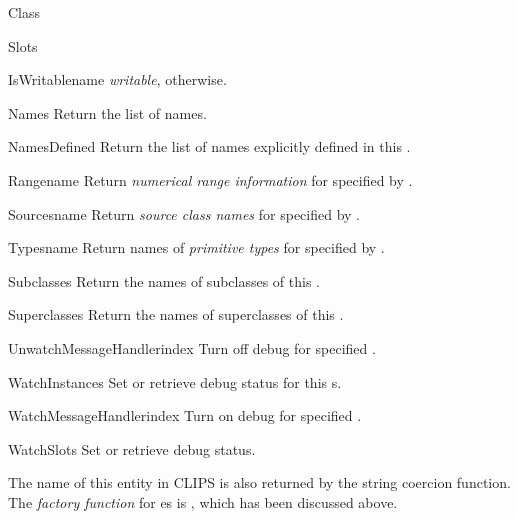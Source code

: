 \begin{classdesc*}{Class}
\begin{memberdesc}[property]{Slots}
\begin{methoddesc}{IsWritable}{name}
\emph{writable},  otherwise.
\end{methoddesc}
\begin{methoddesc}{Names}{}
Return the list of  names.
\end{methoddesc}
\begin{methoddesc}{NamesDefined}{}
Return the list of  names explicitly defined in this
.
\end{methoddesc}
\begin{methoddesc}{Range}{name}
Return \emph{numerical range information} for  specified by
.
\end{methoddesc}
\begin{methoddesc}{Sources}{name}
Return \emph{source class names} for  specified by .
\end{methoddesc}
\begin{methoddesc}{Types}{name}
Return names of \emph{primitive types} for  specified by
.
\end{methoddesc}
\end{memberdesc}

\begin{methoddesc}{Subclasses}{}
Return the names of subclasses of this .
\end{methoddesc}

\begin{methoddesc}{Superclasses}{}
Return the names of superclasses of this .
\end{methoddesc}

\begin{methoddesc}{UnwatchMessageHandler}{index}
Turn off debug for specified .
\end{methoddesc}

\begin{memberdesc}[property]{WatchInstances}
Set or retrieve debug status for this  s.
\end{memberdesc}

\begin{methoddesc}{WatchMessageHandler}{index}
Turn on debug for specified .
\end{methoddesc}

\begin{memberdesc}[property]{WatchSlots}
Set or retrieve  debug status.
\end{memberdesc}

The name of this entity in CLIPS is also returned by the string coercion
function. The \emph{factory function} for es is
, which has been discussed above.

\end{classdesc*}



